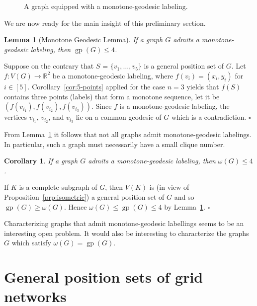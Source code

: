 \documentclass[12pt]{article}
\newtheorem{corollary}[theorem]{Corollary}
\newtheorem{lemma}[theorem]{Lemma}
\newcommand{\proof}{\noindent{\bf Proof.\ }}
\newcommand{\qed}{\hfill $\square$\medskip}
\DeclareMathOperator {\gp} {gp}
\begin{document}
\begin{figure}[ht!]
	\begin{center}
	\end{center}
	\caption{A graph equipped with a  monotone-geodesic labeling.}
	\label{fig:Monotone-Geodesic-Property}
\end{figure}

We are now ready for the main insight of this preliminary section. 

\begin{lemma} [Monotone Geodesic Lemma]
\label{lem:TMGAM4}
If a graph $G$ admits a monotone-geodesic labeling, then $\gp(G) \le 4$. 
\end{lemma}
\proof
Suppose on the contrary that $S$ = $\{v_1,\ldots, v_5\}$ is a general position set of $G$. Let $f:V(G)\rightarrow {\mathbb R}^2$ be a monotone-geodesic labeling, where $f(v_i) = (x_i,y_i)$ for $i\in [5]$. Corollary~\ref{cor:5-points} applied for the case $n=3$ yields that $f(S)$ contains three points (labels) that form a monotone sequence, let it be $(f(v_{i_1}), f(v_{i_2}), f(v_{i_3}))$. Since $f$ is a monotone-geodesic labeling, the vertices  $v_{i_1}$, $v_{i_2}$, and $v_{i_3}$ lie on a common geodesic of $G$ which is a contradiction. 
\qed

From Lemma~\ref{lem:TMGAM4} it follows that not all graphs admit monotone-geodesic labelings. In particular, such a graph must necessarily have a small clique number.  

\begin{corollary}
\label{cor:clique}
If a graph $G$ admits a monotone-geodesic labeling, then $\omega(G)\le 4$. 
\end{corollary}

\proof
If $K$ is a complete subgraph of $G$, then $V(K)$ is (in view of Proposition~\ref{prp:isometric}) a general position set of $G$ and so $\gp(G)\ge \omega(G)$. Hence $\omega(G)\le \gp(G)\le 4$ by Lemma~\ref{lem:TMGAM4}.
\qed

Characterizing graphs that admit monotone-geodesic labellings seems to be an interesting open problem. It would also be interesting to characterize the graphs $G$ which satisfy $\omega(G) = \gp(G)$. 
 
\section{General position sets of grid networks}
\label{sec:networks}
\end{document}
